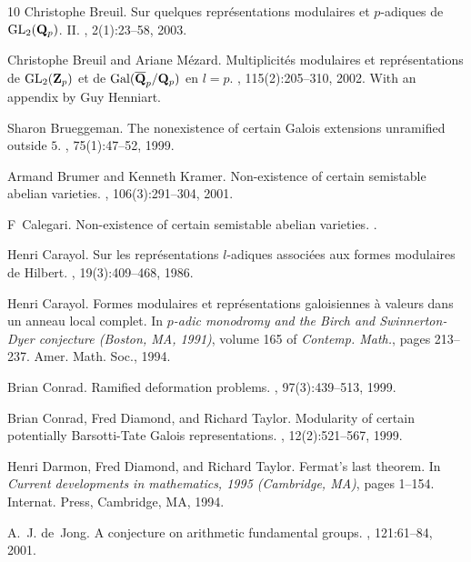 \documentclass[12pt]{article}
\begin{document}
\begin{thebibliography}{10}
Christophe Breuil.
\newblock Sur quelques repr\'esentations modulaires et {$p$}-adiques de {${\rm
  GL}\sb 2(\bold Q\sb p)$}. {II}.
, 2(1):23--58, 2003.

Christophe Breuil and Ariane M{\'e}zard.
\newblock Multiplicit\'es modulaires et repr\'esentations de {${\rm GL}\sb
  2({\bf Z}\sb p)$} et de {${\rm Gal}(\overline{\bf Q}\sb p/{\bf Q}\sb p)$} en
  {$l=p$}.
, 115(2):205--310, 2002.
\newblock With an appendix by Guy Henniart.

Sharon Brueggeman.
\newblock The nonexistence of certain {G}alois extensions unramified outside
  {$5$}.
, 75(1):47--52, 1999.

Armand Brumer and Kenneth Kramer.
\newblock Non-existence of certain semistable abelian varieties.
, 106(3):291--304, 2001.

F~Calegari.
\newblock Non-existence of certain semistable abelian varieties.
.

Henri Carayol.
\newblock Sur les repr\'esentations {$l$}-adiques associ\'ees aux formes
  modulaires de {H}ilbert.
, 19(3):409--468, 1986.

\bibitem{[C94]}
Henri Carayol.
\newblock Formes modulaires et repr\'esentations galoisiennes \`a valeurs dans
  un anneau local complet.
\newblock In {\em $p$-adic monodromy and the Birch and Swinnerton-Dyer
  conjecture (Boston, MA, 1991)}, volume 165 of {\em Contemp. Math.}, pages
  213--237. Amer. Math. Soc., 1994.

Brian Conrad.
\newblock Ramified deformation problems.
, 97(3):439--513, 1999.

Brian Conrad, Fred Diamond, and Richard Taylor.
\newblock Modularity of certain potentially {B}arsotti-{T}ate {G}alois
  representations.
, 12(2):521--567, 1999.

\bibitem{[DDT]}
Henri Darmon, Fred Diamond, and Richard Taylor.
\newblock Fermat's last theorem.
\newblock In {\em Current developments in mathematics, 1995 (Cambridge, MA)},
  pages 1--154. Internat. Press, Cambridge, MA, 1994.

\bibitem{[dJ01]}
A.~J. de~Jong.
\newblock A conjecture on arithmetic fundamental groups.
, 121:61--84, 2001.


\end{thebibliography}
\end{document}
